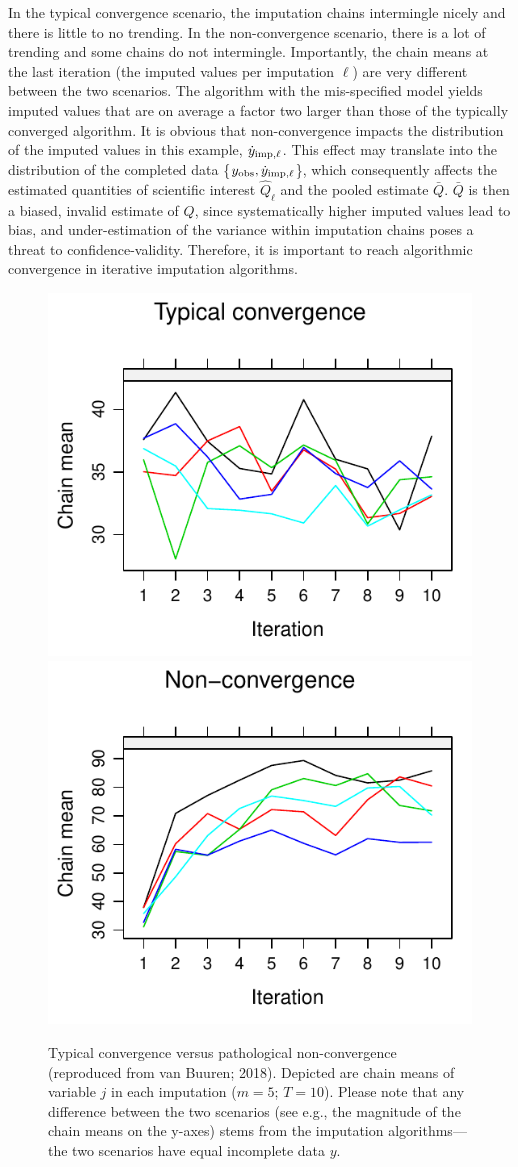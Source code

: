 \documentclass[Royal,times,sageh]{sagej}
\begin{document}
In the typical convergence scenario, the imputation chains intermingle nicely and there is little to no trending. In the non-convergence scenario, there is a lot of trending and some chains do not intermingle. Importantly, the chain means at the last iteration (the imputed values per imputation \(\ell\)) are very different between the two scenarios. The algorithm with the mis-specified model yields imputed values that are on average a factor two larger than those of the typically converged algorithm. It is obvious that non-convergence impacts the distribution of the imputed values in this example, \(\dot y_{\rm imp, \ell}\). This effect may translate into the distribution of the completed data \{\(y_{\rm obs}, \dot y_{\rm imp, \ell}\)\}, which consequently affects the estimated quantities of scientific interest \(\hat{Q}_{\ell}\) and the pooled estimate \(\bar{Q}\). \(\bar{Q}\) is then a biased, invalid estimate of \(Q\), since systematically higher imputed values lead to bias, and under-estimation of the variance within imputation chains poses a threat to confidence-validity. Therefore, it is important to reach algorithmic convergence in iterative imputation algorithms.

\begin{figure}

{\centering \includegraphics[width=.49\linewidth]{2.Manuscript_files/figure-latex/non-conv-1} \includegraphics[width=.49\linewidth]{2.Manuscript_files/figure-latex/non-conv-2} 

}

\caption{Typical convergence versus pathological non-convergence (reproduced from van Buuren; 2018). Depicted are chain means of variable $j$ in each imputation ($m=5$; $T=10$). Please note that any difference between the two scenarios (see e.g., the magnitude of the chain means on the y-axes) stems from the imputation algorithms---the two scenarios have equal incomplete data $y$.}\label{fig:non-conv}
\end{figure}
\end{document}
